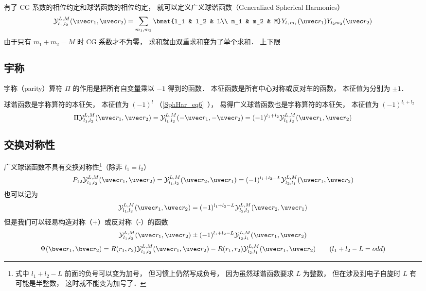 
有了 CG 系数的相位约定和球谐函数的相位约定， 就可以定义广义球谐函数（Generalized Spherical Harmonics）
\begin{equation}\label{GenYlm_eq1}
\mathcal{Y}_{l_1,l_2}^{L,M}(\uvec r_1, \uvec r_2) = \sum_{m_1, m_2} \bmat{l_1 & l_2 & L\\ m_1 & m_2 & M} Y_{l_1 m_1}(\uvec r_1) Y_{l_2 m_2} (\uvec r_2)
\end{equation}
由于只有 $m_1 + m_2 = M$ 时 CG 系数才不为零， 求和就由双重求和变为了单个求和． 上下限

\subsection{宇称}
宇称（parity）算符 $\Pi$ 的作用是把所有自变量乘以 $-1$ 得到的函数． 本征函数是所有中心对称或反对车的函数， 本征值为分别为 $\pm 1$．

球谐函数是宇称算符的本征矢， 本征值为 $(-1)^l$ （\autoref{SphHar_eq6}~）， 易得广义球谐函数也是宇称算符的本征矢， 本征值为 $(-1)^{l_1+l_2}$
\begin{equation}
\Pi \mathcal{Y}_{l_1,l_2}^{L,M}(\uvec r_1, \uvec r_2) =  \mathcal{Y}_{l_1,l_2}^{L,M}(-\uvec r_1, -\uvec r_2) = (-1)^{l_1+l_2} \mathcal{Y}_{l_1,l_2}^{L,M}(\uvec r_1, \uvec r_2)
\end{equation}

\subsection{交换对称性}
广义球谐函数不具有交换对称性\footnote{式中 $l_1+l_2-L$ 前面的负号可以变为加号， 但习惯上仍然写成负号， 因为虽然球谐函数要求 $L$ 为整数， 但在涉及到电子自旋时 $L$ 有可能是半整数， 这时就不能变为加号了．}（除非 $l_1 = l_2$）
\begin{equation}\label{GenYlm_eq4}
P_{12} \mathcal{Y}_{l_1,l_2}^{L,M}(\uvec r_1, \uvec r_2) = \mathcal{Y}_{l_1,l_2}^{L,M}(\uvec r_2, \uvec r_1) = 
(-1)^{l_1+l_2-L} \mathcal{Y}_{l_2,l_1}^{L,M}(\uvec r_1, \uvec r_2)
\end{equation}
也可以记为
\begin{equation}\label{GenYlm_eq5}
\mathcal{Y}_{l_1,l_2}^{L,M}(\uvec r_1, \uvec r_2) = 
(-1)^{l_1+l_2-L} \mathcal{Y}_{l_2,l_1}^{L,M}(\uvec r_2, \uvec r_1)
\end{equation}
但是我们可以轻易构造对称（+）或反对称（-）的函数
\begin{equation}
\mathcal{Y}_{l_1,l_2}^{L,M}(\uvec r_1, \uvec r_2) \pm (-1)^{l_1+l_2-L}\mathcal{Y}_{l_2,l_1}^{L,M}(\uvec r_1, \uvec r_2)
\end{equation}
\begin{equation}
\Psi(\bvec r_1, \bvec r_2) = 
R(r_1, r_2)\mathcal{Y}_{l_1,l_2}^{L,M}(\uvec r_1, \uvec r_2) - R(r_1, r_2)\mathcal{Y}_{l_2,l_1}^{L,M}(\uvec r_1, \uvec r_2) \qquad (l_1+l_2-L = odd)
\end{equation}

